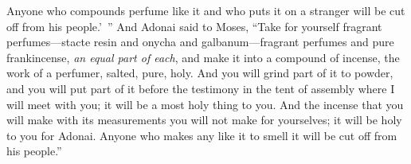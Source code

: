 \begin{biblechapter}
\verse Anyone who compounds perfume like it and who puts it on a stranger will be cut off from his people.’ ”
\verse And Adonai said to Moses, “Take for yourself fragrant perfumes—stacte resin and onycha and galbanum—fragrant perfumes and pure frankincense, \textit{an equal part of each},
\verse and make it into a compound of incense, the work of a perfumer, salted, pure, holy.
\verse And you will grind part of it to powder, and you will put part of it before the testimony in the tent of assembly where I will meet with you; it will be a most holy thing to you.
\verse And the incense that you will make with its measurements you will not make for yourselves; it will be holy to you for Adonai.
\verse Anyone who makes any like it to smell it will be cut off from his people.”
\end{biblechapter}

